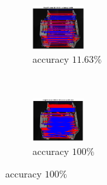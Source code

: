 \documentclass[hyperref={pdfpagelabels=false}]{beamer}
\begin{document}
\begin{frame}
\begin{minipage}[0.2\textheight]{\textwidth}
\begin{columns}[T]
\begin{column}{0.7\textwidth}
		\end{column}
		
		\begin{column}{0.3\textwidth}
			\begin{figure}[h!]
				\begin{subfigure}[b]{0.6\textwidth}
					\centering
					\includegraphics[width=2cm]{"fig/evaluation/HouseSeq2/anchor_descr/using_cpd_afftrafo/solution/fi_1_ProgGM"} 
					\caption{\tiny accuracy $11.63\%$}
				\end{subfigure}\\
				\begin{subfigure}[b]{0.6\textwidth}
					\centering
					\includegraphics[width=2cm]{"fig/evaluation/HouseSeq2/anchor_descr/using_cpd_afftrafo/ext_solution/fi_1_ProgGM"} 
					\caption{\tiny accuracy $100\%$}
				\end{subfigure}
			\end{figure}
		\end{column}
	\end{columns}
\end{minipage}
\end{frame}
\end{document}
